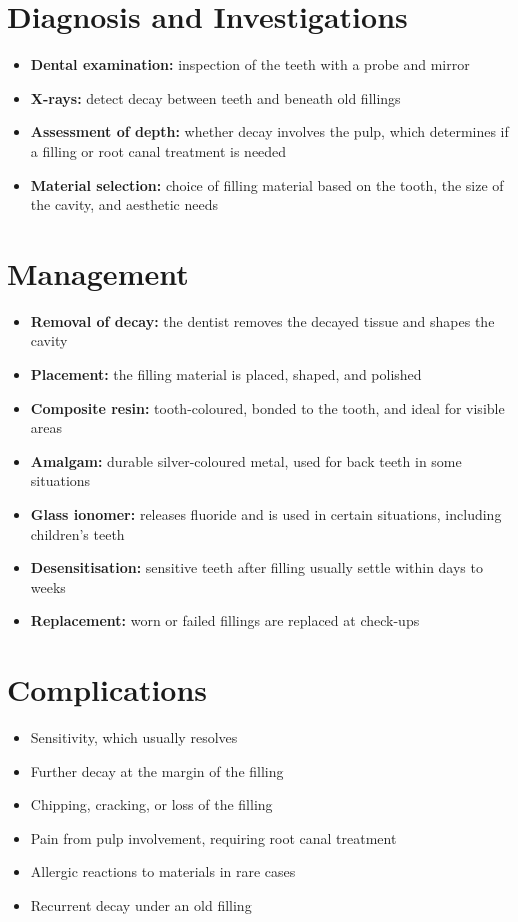 \section*{Diagnosis and Investigations}
\begin{itemize}
    \item \textbf{Dental examination:} inspection of the teeth with a probe and mirror
    \item \textbf{X-rays:} detect decay between teeth and beneath old fillings
    \item \textbf{Assessment of depth:} whether decay involves the pulp, which determines if a filling or root canal treatment is needed
    \item \textbf{Material selection:} choice of filling material based on the tooth, the size of the cavity, and aesthetic needs
\end{itemize}

\section*{Management}
\begin{itemize}
    \item \textbf{Removal of decay:} the dentist removes the decayed tissue and shapes the cavity
    \item \textbf{Placement:} the filling material is placed, shaped, and polished
    \item \textbf{Composite resin:} tooth-coloured, bonded to the tooth, and ideal for visible areas
    \item \textbf{Amalgam:} durable silver-coloured metal, used for back teeth in some situations
    \item \textbf{Glass ionomer:} releases fluoride and is used in certain situations, including children's teeth
    \item \textbf{Desensitisation:} sensitive teeth after filling usually settle within days to weeks
    \item \textbf{Replacement:} worn or failed fillings are replaced at check-ups
\end{itemize}

\section*{Complications}
\begin{itemize}
    \item Sensitivity, which usually resolves
    \item Further decay at the margin of the filling
    \item Chipping, cracking, or loss of the filling
    \item Pain from pulp involvement, requiring root canal treatment
    \item Allergic reactions to materials in rare cases
    \item Recurrent decay under an old filling
\end{itemize}

